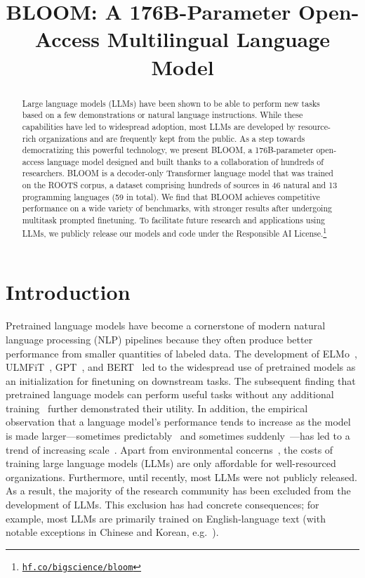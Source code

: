 \title{BLOOM: A 176B-Parameter Open-Access Multilingual Language Model}

\begin{abstract}
Large language models (LLMs) have been shown to be able to perform new tasks based on a few demonstrations or natural language instructions. While these capabilities have led to widespread adoption, most LLMs are developed by resource-rich organizations and are frequently kept from the public. As a step towards democratizing this powerful technology, we present BLOOM, a 176B-parameter open-access language model designed and built thanks to a collaboration of hundreds of researchers. BLOOM is a decoder-only Transformer language model that was trained on the ROOTS corpus, a dataset comprising hundreds of sources in 46 natural and 13 programming languages (59 in total). We find that BLOOM achieves competitive performance on a wide variety of benchmarks, with stronger results after undergoing multitask prompted finetuning. To facilitate future research and applications using LLMs, we publicly release our models and code under the Responsible AI  License.\footnote{\href{https://hf.co/bigscience/bloom}{\texttt{hf.co/bigscience/bloom}}}
\end{abstract}

\section{Introduction}

Pretrained language models have become a cornerstone of modern natural language processing (NLP) pipelines because they often produce better performance from smaller quantities of labeled data. The development of ELMo~\citep{peters2018deep}, ULMFiT~\citep{howard2018universal}, GPT~\citep{radford2018improving}, and BERT~\citep{devlin2019bert} led to the widespread use of pretrained models as an initialization for finetuning on downstream tasks. The subsequent finding that pretrained language models can perform useful tasks without any additional training~\citep{radford2019language,brown2020language} further demonstrated their utility. In addition, the empirical observation that a language model's performance tends to increase as the model is made larger---sometimes predictably~\citep{hestness2017deep,kaplan2020scaling,hoffmann2022training} and sometimes suddenly~\citep{wei2022emergent}---has led to a trend of increasing scale~\citep{zeng2021pangu, rae2021scaling, smith2022using, chowdhery2022palm}. Apart from environmental concerns~\citep{strubell2019energy,lacoste2019quantifying,schwartz2020green}, the costs of training large language models (LLMs) are only affordable for well-resourced organizations. Furthermore, until recently, most LLMs were not publicly released. As a result, the majority of the research community has been excluded from the development of LLMs. This exclusion has had concrete consequences; for example, most LLMs are primarily trained on English-language text (with notable exceptions in Chinese and Korean, e.g.~\citealp{wang2021ernie,zeng2021pangu,kim2021changes}).


